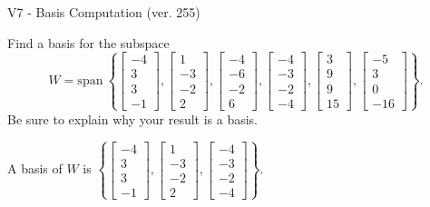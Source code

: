 \begin{exercise}
  \begin{exerciseTitle}V7 - Basis Computation (ver. 255)\end{exerciseTitle}
  \begin{exerciseStatement}
    Find a basis for the subspace 
\[W=\mathrm{span}\ \left\{\left[\begin{array}{r}
-4 \\
3 \\
3 \\
-1
\end{array}\right] , \left[\begin{array}{r}
1 \\
-3 \\
-2 \\
2
\end{array}\right] , \left[\begin{array}{r}
-4 \\
-6 \\
-2 \\
6
\end{array}\right] , \left[\begin{array}{r}
-4 \\
-3 \\
-2 \\
-4
\end{array}\right] , \left[\begin{array}{r}
3 \\
9 \\
9 \\
15
\end{array}\right] , \left[\begin{array}{r}
-5 \\
3 \\
0 \\
-16
\end{array}\right]\right\}.\]
 Be sure to explain why your result is a basis.


  \end{exerciseStatement}
  \begin{exerciseAnswer}
   A basis of \(W\) is  \(\left\{\left[\begin{array}{r}
-4 \\
3 \\
3 \\
-1
\end{array}\right] , \left[\begin{array}{r}
1 \\
-3 \\
-2 \\
2
\end{array}\right] , \left[\begin{array}{r}
-4 \\
-3 \\
-2 \\
-4
\end{array}\right]\right\}\).
  


  \end{exerciseAnswer}
\end{exercise}